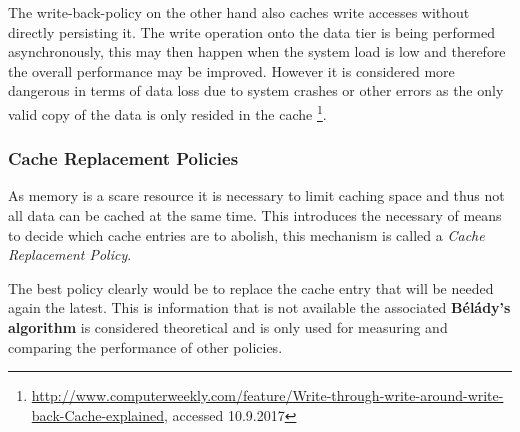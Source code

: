 The write-back-policy on the other hand also caches write accesses without directly persisting it. The write operation onto the data tier is being performed asynchronously, this may then happen when the system load is low and therefore the overall performance may be improved. However it is considered more dangerous in terms of data loss due to system crashes or other errors as the only valid copy of the data is only resided in the cache  \footnote{\href{http://www.computerweekly.com/feature/Write-through-write-around-write-back-Cache-explained}{http://www.computerweekly.com/feature/Write-through-write-around-write-back-Cache-explained}, accessed 10.9.2017}.

\subsubsection{Cache Replacement Policies}
As memory is a scare resource it is necessary to limit caching space and thus not all data can be cached at the same time. This introduces the necessary of means to decide which cache entries are to abolish, this mechanism is called a \emph{Cache Replacement Policy}. 

The best policy clearly would be to replace the cache entry that will be needed again the latest. This is information that is not available the associated \textbf{Bélády's algorithm} is considered theoretical and is only used for measuring and comparing the performance of other policies.

